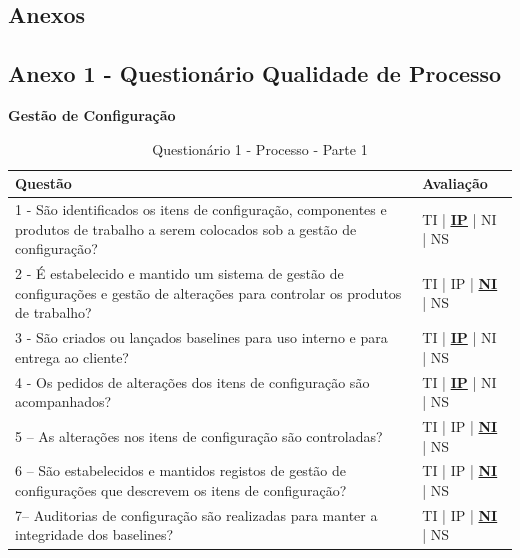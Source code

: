\documentclass[openany,10pt,a4paper]{article}
\begin{document}
\renewcommand\bibname{Referências} %
\setlength{\parskip}{0.7em}



\begin{appendix}

\section*{Anexos}\label{ConteudoAnexos}

\subsection{Anexo 1 - Questionário Qualidade de Processo}\label{anexo_processo}
\begin{table}[H]
	\textbf{Gestão de Configuração}
		\centering
		\caption{Questionário 1 - Processo - Parte 1}
		\begin{tabular}{|p{5in}p{1in}|}		\hline
			\textbf{Questão}  & \textbf{Avaliação}\\ \hline
			1 - São identificados os itens de configuração, componentes e produtos de trabalho a serem 
	colocados sob a gestão de configuração?
	 & TI | \underline{\underline{\textbf{IP}}} | NI | NS \\ \hline
			2 - É estabelecido e mantido um sistema de gestão de configurações e gestão de alterações para 
	controlar os produtos de trabalho?
	 & TI | IP | \underline{\textbf{NI}} | NS \\ \hline
			3 -  São criados ou lançados baselines para uso interno e para entrega ao cliente?
	 & TI | \underline{\textbf{IP}} | NI | NS \\ \hline
			4 - Os pedidos de alterações dos itens de configuração são acompanhados?
	 & TI | \underline{\textbf{IP}} | NI | NS \\ \hline
			5 – As alterações nos itens de configuração são controladas?
	  & TI | IP | \underline{\textbf{NI}} | NS \\ \hline
			6 – São estabelecidos e mantidos registos de gestão de configurações que descrevem os itens 
	de configuração?
	 & TI | IP | \underline{\textbf{NI}} | NS \\ \hline
			7– Auditorias de configuração são realizadas para manter a integridade dos baselines?
	 & TI | IP | \underline{\textbf{NI}} | NS \\ \hline
		\end{tabular} 
	\end{table}
	

\end{appendix}
\end{document}
